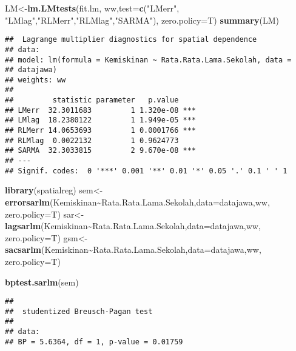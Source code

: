 \documentclass[
]{book}
\newenvironment{Shaded}{\begin{snugshade}}{\end{snugshade}}
\newcommand{\DataTypeTok}[1]{\textcolor[rgb]{0.13,0.29,0.53}{#1}}
\newcommand{\KeywordTok}[1]{\textcolor[rgb]{0.13,0.29,0.53}{\textbf{#1}}}
\newcommand{\NormalTok}[1]{#1}
\newcommand{\OperatorTok}[1]{\textcolor[rgb]{0.81,0.36,0.00}{\textbf{#1}}}
\newcommand{\StringTok}[1]{\textcolor[rgb]{0.31,0.60,0.02}{#1}}
\begin{document}
\begin{Shaded}
\begin{Highlighting}[]
\NormalTok{LM\textless{}{-}}\KeywordTok{lm.LMtests}\NormalTok{(fit.lm, ww,}\DataTypeTok{test=}\KeywordTok{c}\NormalTok{(}\StringTok{"LMerr"}\NormalTok{, }\StringTok{"LMlag"}\NormalTok{,}\StringTok{"RLMerr"}\NormalTok{,}\StringTok{"RLMlag"}\NormalTok{,}\StringTok{"SARMA"}\NormalTok{), }\DataTypeTok{zero.policy=}\NormalTok{T)}
\KeywordTok{summary}\NormalTok{(LM)}
\end{Highlighting}
\end{Shaded}

\begin{verbatim}
##  Lagrange multiplier diagnostics for spatial dependence
## data:  
## model: lm(formula = Kemiskinan ~ Rata.Rata.Lama.Sekolah, data =
## datajawa)
## weights: ww
##  
##         statistic parameter   p.value    
## LMerr  32.3011683         1 1.320e-08 ***
## LMlag  18.2380122         1 1.949e-05 ***
## RLMerr 14.0653693         1 0.0001766 ***
## RLMlag  0.0022132         1 0.9624773    
## SARMA  32.3033815         2 9.670e-08 ***
## ---
## Signif. codes:  0 '***' 0.001 '**' 0.01 '*' 0.05 '.' 0.1 ' ' 1
\end{verbatim}

\begin{Shaded}
\begin{Highlighting}[]
\KeywordTok{library}\NormalTok{(spatialreg)}
\NormalTok{sem\textless{}{-}}\KeywordTok{errorsarlm}\NormalTok{(Kemiskinan}\OperatorTok{\textasciitilde{}}\NormalTok{Rata.Rata.Lama.Sekolah,}\DataTypeTok{data=}\NormalTok{datajawa,ww, }\DataTypeTok{zero.policy=}\NormalTok{T)}
\NormalTok{sar\textless{}{-}}\KeywordTok{lagsarlm}\NormalTok{(Kemiskinan}\OperatorTok{\textasciitilde{}}\NormalTok{Rata.Rata.Lama.Sekolah,}\DataTypeTok{data=}\NormalTok{datajawa,ww, }\DataTypeTok{zero.policy=}\NormalTok{T)}
\NormalTok{gsm\textless{}{-}}\KeywordTok{sacsarlm}\NormalTok{(Kemiskinan}\OperatorTok{\textasciitilde{}}\NormalTok{Rata.Rata.Lama.Sekolah,}\DataTypeTok{data=}\NormalTok{datajawa,ww, }\DataTypeTok{zero.policy=}\NormalTok{T)}

\KeywordTok{bptest.sarlm}\NormalTok{(sem)}
\end{Highlighting}
\end{Shaded}

\begin{verbatim}
## 
##  studentized Breusch-Pagan test
## 
## data:  
## BP = 5.6364, df = 1, p-value = 0.01759
\end{verbatim}
\end{document}
